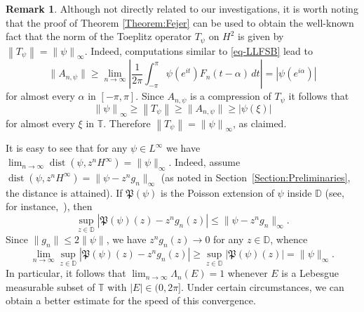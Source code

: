 \documentclass[11pt,reqno]{amsart}
\numberwithin{equation}{section}
\theoremstyle{plain}
\theoremstyle{definition}
\newtheorem{Remark}[equation]{Remark}
\begin{document}
	
	
	
	
	
	
	
	
		
	
	
	
	
	
	
	
	
	

	
	
	\begin{Remark}
	Although not directly related to our investigations, it is worth noting that 
	the proof of Theorem \ref{Theorem:Fejer} can be used to obtain the  well-known fact that
		 the norm of the Toeplitz operator $T_{\psi}$ on $H^2$
		is given by ${\left\| {T_{\psi}} \right\|}= {\left\| {\psi} \right\|}_{\infty}$. 
		Indeed, computations similar to  \eqref{eq-LLFSB} lead to 
		\begin{equation*}
			\| A_{n, \psi} \| \geq  \lim_{n\to\infty} \left| \frac{1}{2\pi}\int_{-\pi}^{\pi} \psi(e^{it}) F_n(t-\alpha)\,dt \right| = | \psi(e^{i\alpha})|
		\end{equation*}
		 for almost every $\alpha$ in $[-\pi,\pi]$.
		Since $A_{n, \psi}$ is a compression of $T_{\psi}$ it follows that
		\begin{equation*}
			{\left\| {\psi} \right\|}_{\infty} \geq {\left\| { T_{\psi} } \right\|} \geq \| A_{n, \psi} \|
			\geq  | \psi(\xi)|
		\end{equation*}
		for almost every $\xi$ in ${\mathbb{T}}$.  Therefore ${\left\| {T_{\psi}} \right\|}= {\left\| {\psi} \right\|}_{\infty}$, as claimed.
		\end{Remark}
	

It is easy to see that for any $\psi\in L^\infty$ we have $\lim_{n\to\infty}{\operatorname{dist}}(\psi, z^n H^\infty)=\|\psi \|_\infty$. Indeed, assume ${\operatorname{dist}}(\psi, z^n H^\infty)=\|\psi-z^ng_n\|_\infty$ (as noted in Section~\ref{Section:Preliminaries}, the distance is attained). If  
$\mathfrak{P}(\psi)$ is the Poisson extension of $\psi$ inside ${\mathbb{D}}$ (see, for instance,~\cite{Ga}), then
\[
\sup_{z\in{\mathbb{D}}} |\mathfrak{P}(\psi)(z)-z^n g_n(z)|\le\|\psi-z^n g_n\|_\infty.
\]
Since $\|g_n\|\le 2\|\psi\|$, we have $z^n g_n(z)\to0$ for any $z\in{\mathbb{D}}$, whence 
\[
\lim_{n\to\infty}\sup_{z\in{\mathbb{D}}} |\mathfrak{P}(\psi)(z)-z^n g_n(z)|\ge \sup_{z\in{\mathbb{D}}}|\mathfrak{P}(\psi)(z)|=\|\psi\|_\infty.
\]
In particular, it follows that $\lim_{n\to\infty} \Lambda_n(E) = 1$ whenever $E$ is a Lebesgue measurable subset of ${\mathbb{T}}$ with $|E| \in (0, 2 \pi]$.
  Under certain circumstances, we can obtain a better estimate for the speed of this convergence.
	
\end{document}
